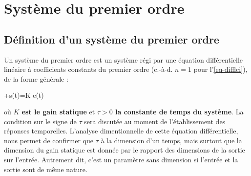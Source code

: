 \pagestyle{empty}
\section*{Système du premier ordre}
\subsection*{Définition d'un système du premier ordre}
Un système du premier ordre est un système régi par une équation
différentielle linéaire à coefficients constants du premier ordre 
(c.-à-d. $n=1$ pour l'\cref{eq-difflci}), de la forme générale :
\begin{bequation}
    \tau{}+s(t)=K e(t)\label{eq-1er}
\end{bequation}
où \textbf{$K$ est le gain statique} et \textbf{$\tau>0$ la constante de 
temps du système}. La condition sur le signe de $\tau$ sera 
discutée au moment de l'établissement des réponses temporelles.
L'analyse dimentionnelle de cette équation différentielle, nous permet 
de confirmer que $\tau$ à la dimension d'un temps, mais surtout que 
la dimension du gain statique est donnée par le rapport des dimensions de 
la sortie sur l'entrée. Autrement dit, c'est un paramètre sans dimension 
si l'entrée et la sortie sont de même nature.
